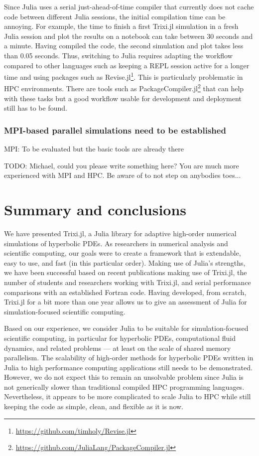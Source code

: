 \documentclass{juliacon}
\newcommand{\trixi}{Trixi.jl\xspace}
\newcommand{\todo}[1]{{\color{red}#1}}
\begin{document}
Since Julia uses a serial just-ahead-of-time compiler that currently does not cache
code between different Julia sessions, the initial compilation time can be
annoying. For example, the time to finish a first \trixi simulation in a fresh Julia
session and plot the results on a notebook can take between 30 seconds and a
minute. Having compiled the code, the second simulation and plot takes less than
0.05 seconds. Thus, switching to Julia requires adapting the workflow compared
to other languages such as keeping a REPL session active for a longer time and
using packages such as Revise.jl\footnote{\url{https://github.com/timholy/Revise.jl}}.
This is particularly problematic in HPC environments. There are tools such as
PackageCompiler.jl\footnote{\url{https://github.com/JuliaLang/PackageCompiler.jl}}
that can help with these tasks but a good workflow usable for development and
deployment still has to be found.

\subsubsection{MPI-based parallel simulations need to be established}

MPI: To be evaluated but the basic tools are already there \cite{byrne2021mpi}

\todo{TODO: Michael, could you please write something here? You are much more
experienced with MPI and HPC. Be aware of \cite{omlin2020solving} to not step
on anybodies toes...} %


\section{Summary and conclusions}
\label{sec:summary}

We have presented \trixi, a Julia library for adaptive high-order numerical
simulations of hyperbolic PDEs. As researchers in numerical analysis and
scientific computing, our goals were to create a framework that is extendable,
easy to use, and fast (in this particular order). Making use of Julia's strengths,
we have been successful based on recent publications making use of \trixi,
the number of students and researchers working with \trixi, and serial performance
comparisons with an established Fortran code. Having developed, from scratch, \trixi for a bit
more than one year allows us to give an assessment of Julia for simulation-focused
scientific computing.

Based on our experience, we consider Julia to be suitable for simulation-focused
scientific computing, in particular for hyperbolic PDEs, computational fluid
dynamics, and related problems --- at least on the scale of shared memory
parallelism. The scalability of high-order methods for hyperbolic PDEs written
in Julia to high performance computing applications still needs to be demonstrated.
However, we do not expect this to remain an unsolvable problem since Julia is not 
generically slower than traditional compiled HPC programming languages. Nevertheless, 
it appears to be more complicated to scale Julia to HPC while still keeping the
code as simple, clean, and flexible as it is now.
\end{document}
